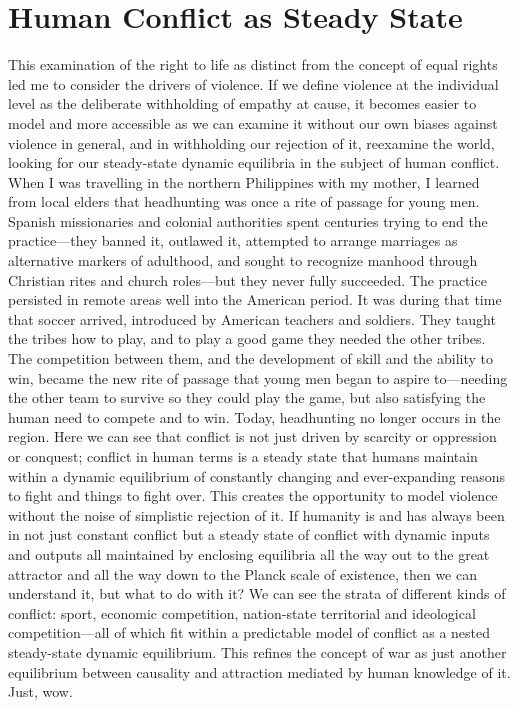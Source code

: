 \chapter{Human Conflict as Steady State}

This examination of the right to life as distinct from the concept of equal rights led me to consider the drivers of violence. If we define violence at the individual level as the deliberate withholding of empathy at cause, it becomes easier to model and more accessible as we can examine it without our own biases against violence in general, and in withholding our rejection of it, reexamine the world, looking for our steady-state dynamic equilibria in the subject of human conflict. When I was travelling in the northern Philippines with my mother, I learned from local elders that headhunting was once a rite of passage for young men. Spanish missionaries and colonial authorities spent centuries trying to end the practice—they banned it, outlawed it, attempted to arrange marriages as alternative markers of adulthood, and sought to recognize manhood through Christian rites and church roles—but they never fully succeeded. The practice persisted in remote areas well into the American period. It was during that time that soccer arrived, introduced by American teachers and soldiers. They taught the tribes how to play, and to play a good game they needed the other tribes. The competition between them, and the development of skill and the ability to win, became the new rite of passage that young men began to aspire to—needing the other team to survive so they could play the game, but also satisfying the human need to compete and to win. Today, headhunting no longer occurs in the region. Here we can see that conflict is not just driven by scarcity or oppression or conquest; conflict in human terms is a steady state that humans maintain within a dynamic equilibrium of constantly changing and ever-expanding reasons to fight and things to fight over. This creates the opportunity to model violence without the noise of simplistic rejection of it. If humanity is and has always been in not just constant conflict but a steady state of conflict with dynamic inputs and outputs all maintained by enclosing equilibria all the way out to the great attractor and all the way down to the Planck scale of existence, then we can understand it, but what to do with it? We can see the strata of different kinds of conflict: sport, economic competition, nation-state territorial and ideological competition—all of which fit within a predictable model of conflict as a nested steady-state dynamic equilibrium. This refines the concept of war as just another equilibrium between causality and attraction mediated by human knowledge of it. Just, wow.

